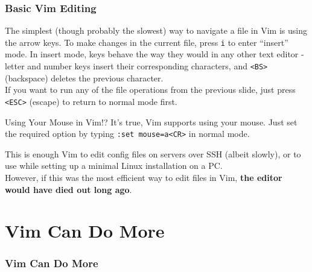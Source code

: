 \documentclass{beamer}
\begin{document}
\begin{frame}[fragile]
    \frametitle{Basic Vim Editing}
    \small
    The simplest (though probably the slowest) way to navigate a file in Vim is using the arrow keys. To make changes in the current file, press \verb+i+ to enter \enquote{insert} mode. In insert mode, keys behave the way they would in any other text editor - letter and number keys insert their corresponding characters, and \verb+<BS>+ (backspace) deletes the previous character. \\
    \vspace{0.5cm}
    If you want to run any of the file operations from the previous slide, just press \verb+<ESC>+ (escape) to return to normal mode first.
    \begin{block}{Using Your Mouse in Vim!?}
	It's true, Vim supports using your mouse. Just set the required option by typing \verb+:set mouse=a<CR>+ in normal mode.
    \end{block}
\end{frame}

\begin{frame}[fragile]
    \small This is enough Vim to edit config files on servers over SSH (albeit slowly), or to use while setting up a minimal Linux installation on a PC. \\
    \vspace{0.5cm}
    However, if this was the most efficient way to edit files in Vim, \textbf{the editor would have died out long ago}.
\end{frame}

\section{Vim Can Do More}

\begin{frame}[fragile]
    \frametitle{Vim Can Do More}
    \tableofcontents[currentsection]
\end{frame}
\end{document}
